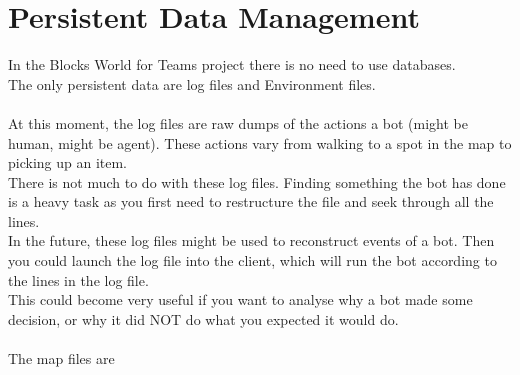 \section{Persistent Data Management}
  In the Blocks World for Teams project there is no need to use databases. \\
  The only persistent data are log files and Environment files.\\ \\
  At this moment, the log files are raw dumps of the actions a bot (might be human, might be agent).
  These actions vary from walking to a spot in the map to picking up an item. \\
  There is not much to do with these log files. Finding something the bot has done is a heavy task as you first need to
  restructure the file and seek through all the lines. \\
  In the future, these log files might be used to reconstruct events of a bot.
  Then you could launch the log file into the client, which will run the bot according to the lines in the log file. \\
  This could become very useful if you want to analyse why a bot made some decision,
  or why it did NOT do what you expected it would do. \\ \\
  The map files are
